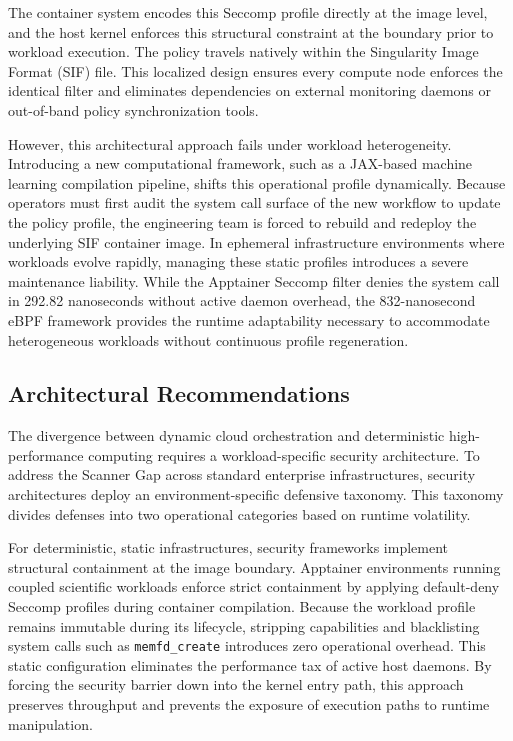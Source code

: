 The container system encodes this Seccomp profile directly at the image level, and the host kernel enforces this structural constraint at the boundary prior to workload execution. The policy travels natively within the Singularity Image Format (SIF) file. This localized design ensures every compute node enforces the identical filter and eliminates dependencies on external monitoring daemons or out-of-band policy synchronization tools.

    However, this architectural approach fails under workload heterogeneity. Introducing a new computational framework, such as a JAX-based machine learning compilation pipeline, shifts this operational profile dynamically. Because operators must first audit the system call surface of the new workflow to update the policy profile, the engineering team is forced to rebuild and redeploy the underlying SIF container image. In ephemeral infrastructure environments where workloads evolve rapidly, managing these static profiles introduces a severe maintenance liability. While the Apptainer Seccomp filter denies the system call in 292.82 nanoseconds without active daemon overhead, the 832-nanosecond eBPF framework provides the runtime adaptability necessary to accommodate heterogeneous workloads without continuous profile regeneration. 

\clearpage 

\subsection{Architectural Recommendations}
\label{sec:architectural_recommendations}

The divergence between dynamic cloud orchestration and deterministic high-performance computing requires a workload-specific security architecture. To address the Scanner Gap across standard enterprise infrastructures, security architectures deploy an environment-specific defensive taxonomy. This taxonomy divides defenses into two operational categories based on runtime volatility.

For deterministic, static infrastructures, security frameworks implement structural containment at the image boundary. Apptainer environments running coupled scientific workloads enforce strict containment by applying default-deny Seccomp profiles during container compilation. Because the workload profile remains immutable during its lifecycle, stripping capabilities and blacklisting system calls such as \texttt{memfd\_create} introduces zero operational overhead. This static configuration eliminates the performance tax of active host daemons. By forcing the security barrier down into the kernel entry path, this approach preserves throughput and prevents the exposure of execution paths to runtime manipulation.

